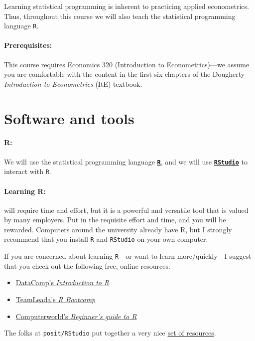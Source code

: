\documentclass[10pt]{article}
\begin{document}
Learning statistical programming is inherent to practicing applied econometrics. Thus, throughout this course we will also teach the statistical programming language \texttt{{R}}.

\paragraph{Prerequisites:} This course requires Economics 320 (Introduction to Econometrics)---we assume you are comfortable with the content in the first six chapters of the Dougherty \textit{Introduction to Econometrics} (ItE) textbook.

\section*{Software and tools}

\paragraph{R:} We will use the statistical programming language \href{https://www.r-project.org/}{\textbf{\texttt{R}}}, and we will use \href{https://posit.co/products/open-source/rstudio/}{\textbf{\texttt{RStudio}}} to interact with \texttt{R}.

\paragraph{Learning R:} will require time and effort, but it is a powerful and versatile tool that is valued by many employers. Put in the requisite effort and time, and you will be rewarded. Computers around the university already have R, but I strongly recommend that you install \texttt{R} and \texttt{RStudio} on your own computer.

If you are concerned about learning \texttt{R}---or want to learn more/quickly---I suggest that you check out the following free, online resources.
\begin{itemize}
  \item \href{https://www.datacamp.com/courses/free-introduction-to-r}{DataCamp's \textit{Introduction to R}}
  \item \href{https://www.teamleada.com/courses/r-bootcamp}{TeamLeada's \textit{R Bootcamp}}
  \item \href{https://www.computerworld.com/article/2497143/business-intelligence-beginner-s-guide-to-r-introduction.html}{Computerworld's \textit{Beginner's guide to R}}
\end{itemize}
The folks at \texttt{posit/RStudio} put together a very nice \href{https://education.rstudio.com/learn/beginner/}{set of resources}.
\end{document}
